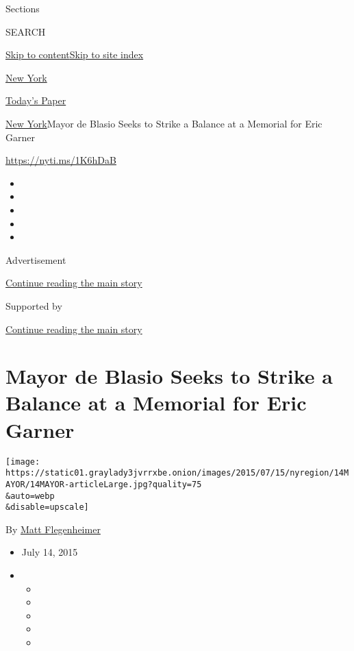 Sections

SEARCH

\protect\hyperlink{site-content}{Skip to
content}\protect\hyperlink{site-index}{Skip to site index}

\href{https://www.nytimes3xbfgragh.onion/section/nyregion}{New York}

\href{https://myaccount.nytimes3xbfgragh.onion/auth/login?response_type=cookie\&client_id=vi}{}

\href{https://www.nytimes3xbfgragh.onion/section/todayspaper}{Today's
Paper}

\href{/section/nyregion}{New York}\textbar{}Mayor de Blasio Seeks to
Strike a Balance at a Memorial for Eric Garner

\url{https://nyti.ms/1K6hDaB}

\begin{itemize}
\item
\item
\item
\item
\item
\end{itemize}

Advertisement

\protect\hyperlink{after-top}{Continue reading the main story}

Supported by

\protect\hyperlink{after-sponsor}{Continue reading the main story}

\hypertarget{mayor-de-blasio-seeks-to-strike-a-balance-at-a-memorial-for-eric-garner}{%
\section{Mayor de Blasio Seeks to Strike a Balance at a Memorial for
Eric
Garner}\label{mayor-de-blasio-seeks-to-strike-a-balance-at-a-memorial-for-eric-garner}}

\texttt{[image: https://static01.graylady3jvrrxbe.onion/images/2015/07/15/nyregion/14MAYOR/14MAYOR-articleLarge.jpg?quality=75\\\&auto=webp\\\&disable=upscale]}

By \href{http://www.nytimes3xbfgragh.onion/by/matt-flegenheimer}{Matt
Flegenheimer}

\begin{itemize}
\item
  July 14, 2015
\item
  \begin{itemize}
  \item
  \item
  \item
  \item
  \item
  \end{itemize}
\end{itemize}

